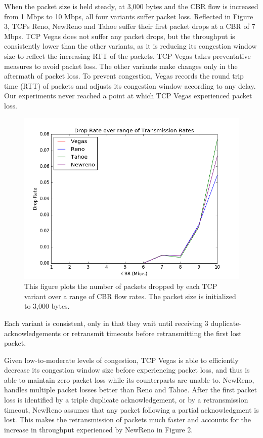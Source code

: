 When the packet size is held steady, at 3,000 bytes and the CBR flow is increased from 1 Mbps to 10 Mbps, all four variants suffer packet loss. Reflected in Figure 3, TCPs Reno, NewReno and Tahoe suffer their first packet drops at a CBR of 7 Mbps. TCP Vegas does not suffer any packet drops, but the throughput is consistently lower than the other variants, as it is reducing its congestion window size to reflect the increasing RTT of the packets. TCP Vegas takes preventative measures to avoid packet loss. The other variants make changes only in the aftermath of packet loss. To prevent congestion, Vegas records the round trip time (RTT) of packets and adjusts its congestion window according to any delay. Our experiments never reached a point at which TCP Vegas experienced packet loss.

\begin{figure}[!htbp]
	\includegraphics[scale=0.4]{P2.png}
	\caption{This figure plots the number of packets dropped by each TCP variant over a range of CBR flow rates. The packet size is initialized to 3,000 bytes.}
	\label{a:label}
\end{figure}

Each variant is consistent, only in that they wait until receiving 3 duplicate-acknowledgements or retransmit timeouts before retransmitting the first lost packet. 

Given low-to-moderate levels of congestion, TCP Vegas is able to efficiently decrease its congestion window size before experiencing packet loss, and thus is able to maintain zero packet loss while its counterparts are unable to. NewReno, handles multiple packet losses better than Reno and Tahoe. After the first packet loss is identified by a triple duplicate acknowledgement, or by a retransmission timeout, NewReno assumes that any packet following a partial acknowledgment is lost. This makes the retransmission of packets much faster and accounts for the increase in throughput experienced by NewReno in Figure 2.



